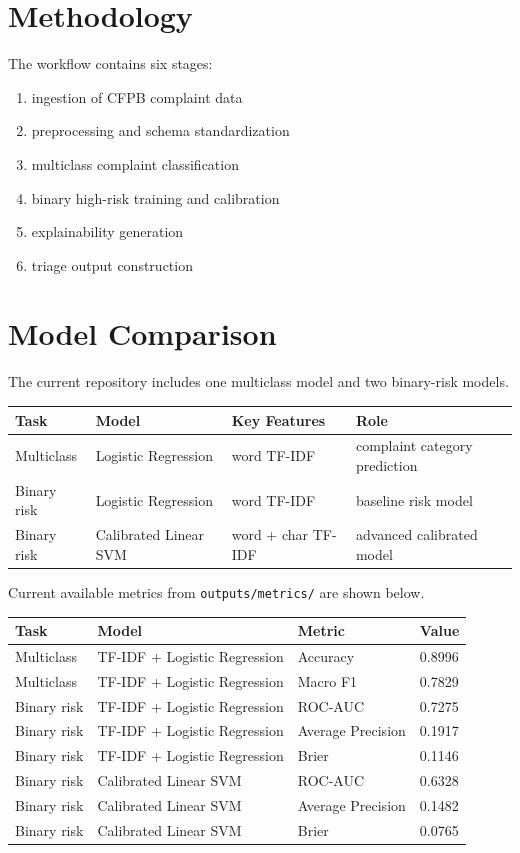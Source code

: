 \documentclass[11pt]{article}
\begin{document}
\section{Methodology}
The workflow contains six stages:
\begin{enumerate}
\item ingestion of CFPB complaint data
\item preprocessing and schema standardization
\item multiclass complaint classification
\item binary high-risk training and calibration
\item explainability generation
\item triage output construction
\end{enumerate}

\section{Model Comparison}
The current repository includes one multiclass model and two binary-risk models.

\begin{center}
\begin{tabular}{llll}
\toprule
Task & Model & Key Features & Role \\
\midrule
Multiclass & Logistic Regression & word TF-IDF & complaint category prediction \\
Binary risk & Logistic Regression & word TF-IDF & baseline risk model \\
Binary risk & Calibrated Linear SVM & word + char TF-IDF & advanced calibrated model \\
\bottomrule
\end{tabular}
\end{center}

Current available metrics from \texttt{outputs/metrics/} are shown below.

\begin{center}
\begin{tabular}{llll}
\toprule
Task & Model & Metric & Value \\
\midrule
Multiclass & TF-IDF + Logistic Regression & Accuracy & 0.8996 \\
Multiclass & TF-IDF + Logistic Regression & Macro F1 & 0.7829 \\
Binary risk & TF-IDF + Logistic Regression & ROC-AUC & 0.7275 \\
Binary risk & TF-IDF + Logistic Regression & Average Precision & 0.1917 \\
Binary risk & TF-IDF + Logistic Regression & Brier & 0.1146 \\
Binary risk & Calibrated Linear SVM & ROC-AUC & 0.6328 \\
Binary risk & Calibrated Linear SVM & Average Precision & 0.1482 \\
Binary risk & Calibrated Linear SVM & Brier & 0.0765 \\
\bottomrule
\end{tabular}
\end{center}
\end{document}
